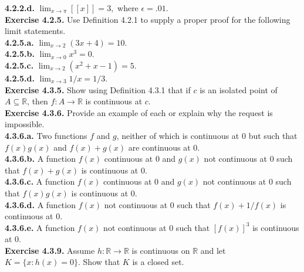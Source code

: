 \documentclass[12pt,letterpaper]{article}
\begin{document}
\textbf{4.2.2.d.} \(\lim_{x \to \pi} [[x]] = 3,\) where \(\epsilon = .01\). \\



\textbf{Exercise 4.2.5.} Use Definition 4.2.1 to supply a proper proof for the following limit statements. \\

\textbf{4.2.5.a.} \(\lim_{x \to 2} (3x + 4) = 10\). \\



\textbf{4.2.5.b.} \(\lim_{x \to 0} x^{3} = 0\). \\



\textbf{4.2.5.c.} \(\lim_{x \to 2}(x^{2} + x - 1) = 5\). \\



\textbf{4.2.5.d.} \(\lim_{x \to 3} 1/x = 1/3\). \\



\textbf{Exercise 4.3.5.} Show using Definition 4.3.1 that if \(c\) is an isolated point of \(A \subseteq \mathbb{R}\), then \(f : A \to \mathbb{R}\) is continuous at \(c\). \\



\textbf{Exercise 4.3.6.} Provide an example of each or explain why the request is impossible. \\

\textbf{4.3.6.a.} Two functions \(f\) and \(g\), neither of which is continuous at \(0\) but such that \(f(x)g(x)\) and \(f(x)+g(x)\) are continuous at \(0\). \\



\textbf{4.3.6.b.} A function \(f(x)\) continuous at \(0\) and \(g(x)\) not continuous at \(0\) such that \(f(x) + g(x)\) is continuous at \(0\). \\



\textbf{4.3.6.c.} A function \(f(x)\) continuous at \(0\) and \(g(x)\) not continuous at \(0\) such that \(f(x)g(x)\) is continuous at \(0\). \\



\textbf{4.3.6.d.} A function \(f(x)\) not continuous at \(0\) such that \(f(x) + 1/f(x)\) is continuous at \(0\). \\



\textbf{4.3.6.e.} A function \(f(x)\) not continuous at \(0\) such that \([f(x)]^{3}\) is continuous at \(0\). \\



\textbf{Exercise 4.3.9.} Assume \(h : \mathbb{R} \to \mathbb{R}\) is continuous on \(\mathbb{R}\) and let \(K = \{x : h(x) = 0\}\). Show that \(K\) is a closed set. \\
\end{document}

